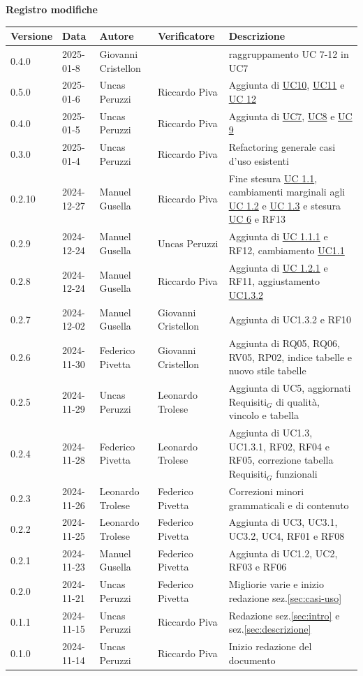 \documentclass[11pt]{article}
\begin{document}
\centering\textbf{Registro modifiche}\\
\vspace{2mm}
\begin{tabularx}{\textwidth}{|l|l|l|l|X|}
\hline
\textbf{Versione} & \textbf{Data} & \textbf{Autore} & \textbf{Verificatore} & \textbf{Descrizione} \\
\hline
0.4.0 & 2025-01-8 & Giovanni Cristellon &  & raggruppamento UC 7-12 in UC7\\
\hline
0.5.0 & 2025-01-6 & Uncas Peruzzi & Riccardo Piva & Aggiunta di \hyperref[UC10]{UC10}, \hyperref[UC11]{UC11} e \hyperref[UC12]{UC 12}\\
\hline
0.4.0 & 2025-01-5 & Uncas Peruzzi & Riccardo Piva & Aggiunta di \hyperref[UC7]{UC7}, \hyperref[UC8]{UC8} e \hyperref[UC9]{UC 9}\\
\hline
0.3.0 & 2025-01-4 & Uncas Peruzzi & Riccardo Piva & Refactoring generale casi d'uso esistenti\\
\hline
0.2.10 & 2024-12-27 & Manuel Gusella & Riccardo Piva & Fine stesura \hyperref[UC1.1]{UC 1.1}, cambiamenti marginali agli \hyperref[UC1.2]{UC 1.2} e \hyperref[UC1.3]{UC 1.3} e stesura \hyperref[UC6]{UC 6} e RF13\\
\hline
0.2.9 & 2024-12-24 & Manuel Gusella & Uncas Peruzzi & Aggiunta di \hyperref[UC1.1.1]{UC 1.1.1} e RF12, cambiamento \hyperref[UC1.1]{UC1.1} \\
\hline
0.2.8 & 2024-12-24 & Manuel Gusella & Riccardo Piva & Aggiunta di \hyperref[UC1.2.1]{UC 1.2.1} e RF11, aggiustamento \hyperref[UC1.3.2]{UC1.3.2} \\
\hline
0.2.7 & 2024-12-02 & Manuel Gusella & Giovanni Cristellon & Aggiunta di UC1.3.2 e RF10 \\
\hline
0.2.6 & 2024-11-30 & Federico Pivetta & Giovanni Cristellon & Aggiunta di RQ05, RQ06, RV05, RP02, indice tabelle e nuovo stile tabelle \\
\hline
0.2.5 & 2024-11-29 & Uncas Peruzzi & Leonardo Trolese & Aggiunta di UC5, aggiornati Requisiti$_G$ di qualità, vincolo e tabella \\
\hline
0.2.4 & 2024-11-28 & Federico Pivetta & Leonardo Trolese & Aggiunta di UC1.3, UC1.3.1, RF02, RF04 e RF05, correzione tabella Requisiti$_G$ funzionali \\
\hline
0.2.3 & 2024-11-26 & Leonardo Trolese  & Federico Pivetta & Correzioni minori grammaticali e di contenuto \\
\hline
0.2.2 & 2024-11-25 & Leonardo Trolese  & Federico Pivetta & Aggiunta di UC3, UC3.1, UC3.2, UC4, RF01 e RF08 \\
\hline
0.2.1 & 2024-11-23 & Manuel Gusella  & Federico Pivetta & Aggiunta di UC1.2, UC2, RF03 e RF06\\
\hline
0.2.0 & 2024-11-21 & Uncas Peruzzi  & Federico Pivetta & Migliorie varie e inizio redazione sez.\ref{sec:casi-uso} \\
\hline
0.1.1 & 2024-11-15 & Uncas Peruzzi  & Riccardo Piva & Redazione sez.\ref{sec:intro} e sez.\ref{sec:descrizione} \\
\hline
0.1.0 & 2024-11-14 & Uncas Peruzzi  & Riccardo Piva & Inizio redazione del documento\\
\hline
\end{tabularx}
\end{document}
